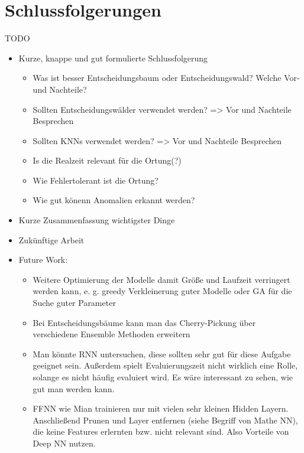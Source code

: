\chapter{Schlussfolgerungen}
TODO

\begin{itemize}
    \item Kurze, knappe und gut formulierte Schlussfolgerung
    \begin{itemize}
        \item Was ist besser Entscheidungsbaum oder Entscheidungswald? Welche Vor- und Nachteile?
        \item Sollten Entscheidungswälder verwendet werden? => Vor und Nachteile Besprechen
        \item Sollten KNNs verwendet werden? => Vor und Nachteile Besprechen
        \item Is die Realzeit relevant für die Ortung(?)
        \item Wie Fehlertolerant ist die Ortung?
        \item Wie gut könenn Anomalien erkannt werden?
    \end{itemize}
    \item Kurze Zusammenfassung wichtigster Dinge
    \item Zukünftige Arbeit
    \item Future Work:
    \begin{itemize}
        \item Weitere Optimierung der Modelle damit Größe und Laufzeit verringert werden kann,
              e. g. greedy Verkleinerung guter Modelle oder GA für die Suche guter Parameter
        \item Bei Entscheidungsbäume kann man das Cherry-Pickung über verschiedene Ensemble Methoden erweitern
        \item Man könnte RNN untersuchen, diese sollten sehr gut für diese Aufgabe geeignet sein. Außerdem spielt Evaluierungszeit nicht wirklich eine Rolle, solange es nicht häufig evaluiert wird.
        Es wäre interessant zu sehen, wie gut man werden kann.
        \item FFNN wie Mian trainieren nur mit vielen sehr kleinen Hidden Layern. Anschließend Prunen und Layer entfernen (siehe Begriff von Mathe NN), die keine Features erlernten bzw. nicht relevant sind.
        Also Vorteile von Deep NN nutzen.
    \end{itemize}
\end{itemize}